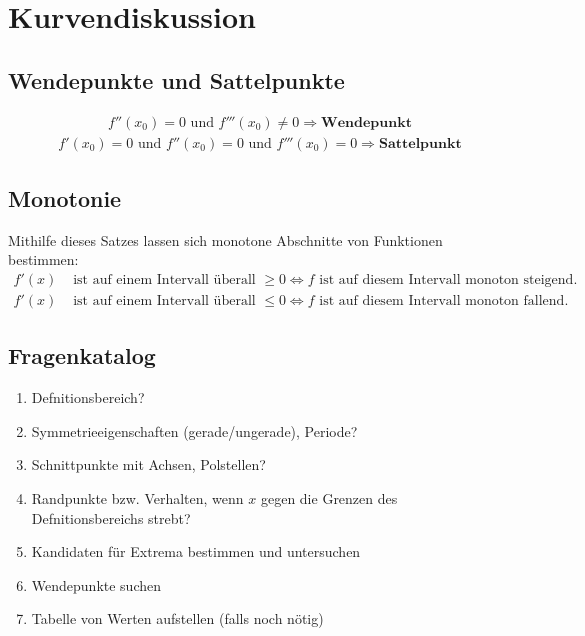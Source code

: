 \section{Kurvendiskussion}
\subsection{Wendepunkte und Sattelpunkte}
\begin{align*}
	f''(x_0) = 0 \text{ und } f'''(x_0) \neq 0 \Rightarrow \textbf{Wendepunkt}
\end{align*}
\begin{align*}
	f'(x_0) = 0 \text{ und } f''(x_0) = 0 \text{ und } f'''(x_0) = 0 \Rightarrow \textbf{Sattelpunkt}
\end{align*}
\subsection{Monotonie}
Mithilfe dieses Satzes lassen sich monotone Abschnitte von Funktionen bestimmen:
\begin{align*}
	f'(x) & \text{ ist auf einem Intervall überall } \geq 0 \Leftrightarrow f \text{ ist auf diesem Intervall monoton steigend.} \\
	f'(x) & \text{ ist auf einem Intervall überall } \leq 0 \Leftrightarrow f \text{ ist auf diesem Intervall monoton fallend.}
\end{align*}
\subsection{Fragenkatalog}
\begin{enumerate}
	\item Defnitionsbereich?
	\item Symmetrieeigenschaften (gerade/ungerade), Periode?
	\item Schnittpunkte mit Achsen, Polstellen?
	\item Randpunkte bzw. Verhalten, wenn $x$ gegen die Grenzen des Defnitionsbereichs strebt?
	\item Kandidaten für Extrema bestimmen und untersuchen
	\item Wendepunkte suchen
	\item Tabelle von Werten aufstellen (falls noch nötig)
\end{enumerate}
